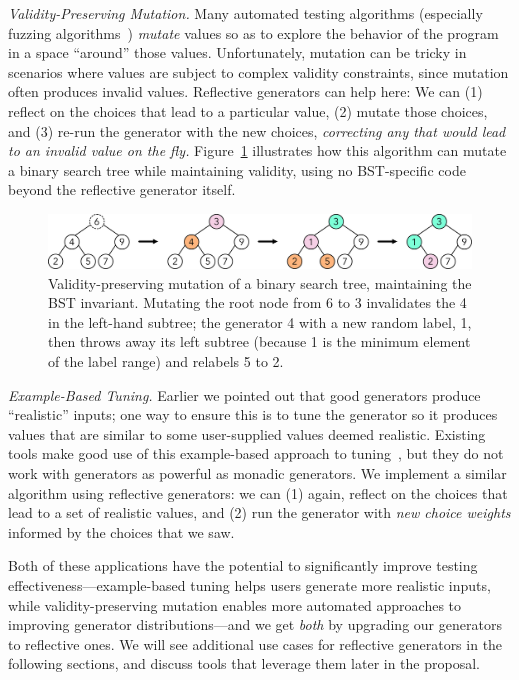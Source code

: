 \medskip

{\em Validity-Preserving Mutation.}
Many automated testing algorithms
(especially fuzzing algorithms~\cite{afl-readme}) {\em mutate} values
so as to explore
the behavior of the program in a space ``around'' those
values. Unfortunately, mutation can be
tricky in scenarios where values are subject to complex validity
constraints, since mutation often produces invalid values. Reflective
generators can help here: We can (1) reflect on the choices that lead
to a particular
value, (2) mutate those choices, and (3) re-run the generator with the new
choices, {\em correcting any that
would lead to an invalid value on the fly.} Figure~\ref{fig:mutation}
illustrates how this
algorithm can mutate a binary search tree while maintaining validity,
using no BST-specific code beyond the reflective generator itself.
\begin{figure}[t]
  \centering
  \includegraphics[width=.6\textwidth]{assets/mutate-diagram.pdf}
  \vspace{-2mm}
  \caption{Validity-preserving mutation of a binary search tree, maintaining the
  BST invariant. Mutating the root node from 6 to 3 invalidates the
  4 in the left-hand subtree; the generator 4 with a new random label,
1, then throws away its left subtree (because 1 is the
minimum element of the label range) and relabels 5 to 2.}\label{fig:mutation}
\end{figure}

\medskip

{\em Example-Based Tuning.} Earlier we pointed out that good generators
produce ``realistic'' inputs; one way to ensure this is to tune the generator so
it produces values that are similar to some user-supplied values deemed
realistic. Existing tools make good use of this example-based approach to
tuning~\cite{soremekun2020inputs}, but they do not work with generators as
powerful as monadic generators. We implement a similar algorithm using
reflective generators: we can (1) again, reflect on the choices that lead to a
set of realistic values, and (2) run the generator with {\em new choice weights}
informed by the choices that we saw.

Both of these applications have the potential to significantly improve
testing effectiveness---example-based tuning helps users generate more
realistic inputs, while validity-preserving mutation enables more
automated approaches to improving generator distributions---and we get
{\em both} by upgrading our generators to reflective ones. We
will see additional use cases for reflective generators in the
following sections, and discuss tools that leverage them later in the proposal.

